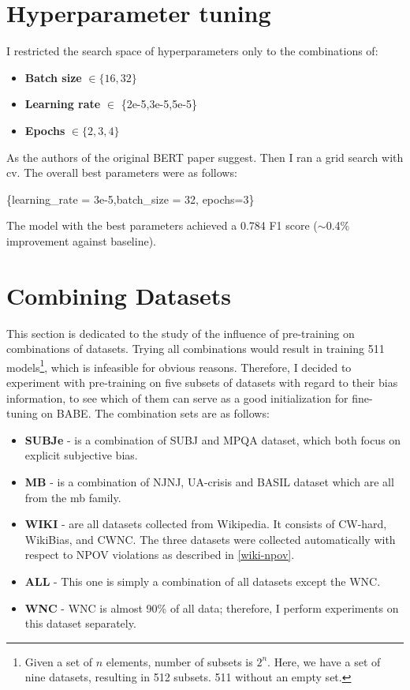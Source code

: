  
 
 
 
 \section{Hyperparameter tuning}
I restricted the search space of hyperparameters only to the combinations of:
 \begin{itemize}
     \item \textbf{Batch size} $\in \{16,32\}$
     \item \textbf{Learning rate} $\in $ \{2e-5,3e-5,5e-5\}
     \item \textbf{Epochs} $\in \{2,3,4\}$
 \end{itemize}
 
 As the authors of the original BERT paper suggest. Then I ran a grid search with \gls{cv}. The overall best parameters were as follows:
 \begin{center}
      \{learning\_rate = 3e-5,batch\_size = 32, epochs=3\}\label{hyperparams}
 \end{center}
 
 The model with the best parameters achieved a 0.784 F1 score ($\sim$0.4\% improvement against baseline).


 
 






\section{Combining Datasets}
This section is dedicated to the study of the influence of pre-training on combinations of datasets. Trying all combinations would result in training 511 models\footnote{Given a set of $n$ elements, number of subsets is $2^n$. Here, we have a set of nine datasets, resulting in 512 subsets. 511 without an empty set.}, which is infeasible for obvious reasons. Therefore, I decided to experiment with pre-training on five subsets of datasets with regard to their bias information, to see which of them can serve as a good initialization for fine-tuning on BABE.
The combination sets are as follows:
\begin{itemize}
    \item \textbf{SUBJe} - is a combination of SUBJ and MPQA dataset, which both focus on explicit subjective bias.
    \item \textbf{MB} - is a combination of NJNJ, UA-crisis and BASIL dataset which are all from the \gls{mb} family.
    \item \textbf{WIKI} - are all datasets collected from Wikipedia. It consists of CW-hard, WikiBias, and CWNC. The three datasets were collected automatically with respect to NPOV violations as described in \ref{wiki-npov}.
    \item \textbf{ALL} - This one is simply a combination of all datasets except the WNC.
    \item \textbf{WNC} - WNC is almost 90\% of all data; therefore, I perform experiments on this dataset separately.
\end{itemize}
 
